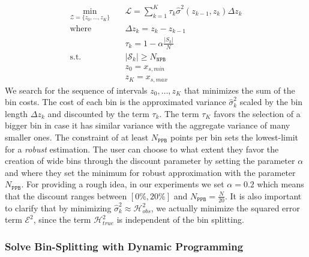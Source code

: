 \documentclass[twoside]{article}
\begin{document}
\begin{equation}
  \label{eq:opt}
\begin{aligned}
  \min_{ \mathcal{Z} = \{z_0, \ldots, z_K\}} \quad & \mathcal{L} = \sum_{k=1}^K \tau_k \hat{\sigma}^2(z_{k-1}, z_k) \Delta z_k \\
  \textrm{where} \quad & \Delta z_k = z_k - z_{k-1} \\
  & \tau_k = 1 - \alpha \frac{|S_k|}{N} \\
  \textrm{s.t.} \quad & |\mathcal{S}_k| \geq N_{\mathtt{NPB}}\\
                                     & z_0 = x_{s,min}\\
                                     & z_K = x_{s, max}
\end{aligned}
\end{equation}
%
We search for the sequence of intervals \(z_0, \ldots, z_K\) that
minimizes the sum of the bin costs. The cost of each bin is the
approximated variance \(\hat{\sigma}^2_k\) scaled by the bin length
\(\Delta z_k\) and discounted by the term \(\tau_k\). The term
\(\tau_K\) favors the selection of a bigger bin in case it has similar
variance with the aggregate variance of many smaller ones. The
constraint of at least \(N_{\mathtt{PPB}}\) points per bin sets the
lowest-limit for a \textit{robust} estimation. The user can choose to
what extent they favor the creation of wide bins through the discount
parameter by setting the parameter \(\alpha\) and where they set the
minimum for robust approximation with the parameter
\(N_{\mathtt{PPB}}\). For providing a rough idea, in our experiments
we set \(\alpha = 0.2\) which means that the discount ranges between
\([0\%, 20\%]\) and \(N_{\mathtt{PPB}} = \frac{N}{20}\). It is also
important to clarify that by minimizing
\(\hat{\sigma}^2_k \approx \mathcal{H}_{obs}^2\), we actually minimize
the squared error term \(\mathcal{E}^2\), since the term
\(\mathcal{H}^2_{true}\) is independent of the bin splitting.

\subsubsection{Solve Bin-Splitting with Dynamic Programming}
\label{sec:dynamic-programing}
\end{document}
